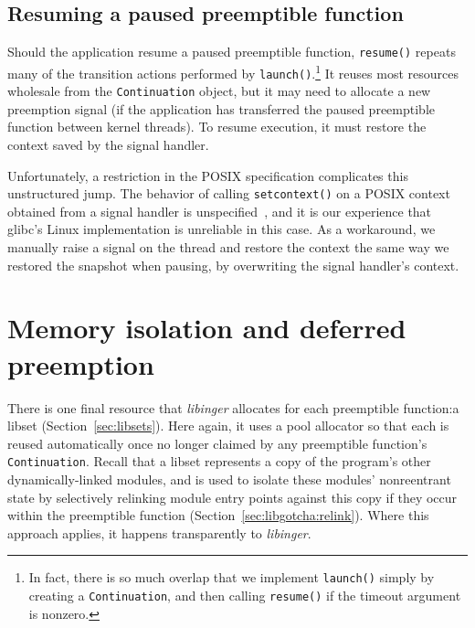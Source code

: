 \subsection{Resuming a paused preemptible function}
\label{sec:libinger:resuming}

\begin{sloppypar}
Should the application resume a paused preemptible function, \texttt{resume()}
repeats many of the transition actions performed by \texttt{launch()}.\footnote{In
fact, there is so much overlap that we implement \texttt{launch()} simply by creating
a \texttt{Continuation}, and then calling \texttt{resume()} if the timeout argument is
nonzero.}  It reuses most resources wholesale from the \texttt{Continuation} object,
but it may need to allocate a new preemption signal (if the application has
transferred the paused preemptible function between kernel threads).  To resume
execution, it must restore the context saved by the signal handler.
\end{sloppypar}

Unfortunately, a restriction in the POSIX specification complicates this unstructured
jump.  The behavior of calling \texttt{setcontext()} on a POSIX context obtained from
a signal handler is unspecified~\cite{getcontext-manpage}, and it is our experience
that glibc's Linux implementation is unreliable in this case.  As a workaround, we
manually raise a signal on the thread and restore the context the same way we
restored the snapshot when pausing, by overwriting the signal handler's context.


\section{Memory isolation and deferred preemption}
\label{sec:libinger:isolation}

There is one final resource that \textit{libinger} allocates for each preemptible
function:\@ a libset (Section~\ref{sec:libsets}).  Here again, it uses a pool
allocator so that each is reused automatically once no longer claimed by any
preemptible function's \texttt{Continuation}.  Recall that a libset represents a copy
of the program's other dynamically-linked modules, and is used to isolate these
modules' nonreentrant state by selectively relinking module entry points against this
copy if they occur within the preemptible function
(Section~\ref{sec:libgotcha:relink}).  Where this approach applies, it happens
transparently to \textit{libinger}.

